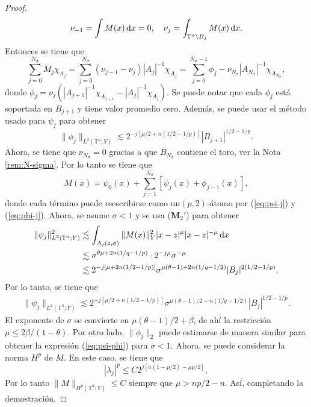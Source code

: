 \begin{proof}
	\begin{equation*}
		\nu_{-1} = \int M(x)\mathop{}\!\mathrm{d} x = 0, \quad \nu_j = \int_{\mathbb{T}^n\setminus B_j} M(x)\mathop{}\!\mathrm{d} x.
	\end{equation*}
	Entonces se tiene que
	\begin{equation*}
		\sum_{j=0}^{N_\sigma}M_j \chi_{A_j} =\sum_{j=0}^{N_\sigma}(\nu_{j-1}-\nu_j)|A_j|^{-1}\chi_{A_j} = \sum_{j=0}^{N_\sigma-1}\phi_j - \nu_{N_\sigma}|A_{N_\sigma}|^{-1}\chi_{A_{N_\sigma}},
	\end{equation*}
	donde $\phi_j=\nu_j\left( |A_{j+1}|^{-1}\chi_{A_{j+1}} - |A_{j}|^{-1}\chi_{A_{j}}  \right)$. Se puede notar que cada $\phi_j$ está soportada en $B_{j+1}$ y tiene valor promedio cero. Además, se puede usar el método usado para $\psi_j$ para obtener
	\begin{equation}
		\|\phi_j\|_{L^2(\mathbb{T}^n;Y)} \lesssim 2^{-j[\mu/2 + n(1/2-1/p)]} |B_{j+1}|^{1/2-1/p}.
		\label{eq:phi-j}
	\end{equation}
	Ahora, se tiene que $\nu_{N_\sigma}=0$ gracias a que $B_{N_\sigma}$ contiene el toro, ver la Nota \ref{rem:N-sigma}. Por lo tanto se tiene que 
	\begin{equation}
		M(x)= \psi_0(x)+ \sum_{j=1}^{N_\sigma} \left[\psi_j(x) + \phi_{j-1}(x) \right],
		\label{eq:psi-phi}
	\end{equation}
	donde cada término puede reescribirse como un$(p,2)$-átomo por (\ref{eq:psi-j}) y (\ref{eq:phi-j}). Ahora, se asume $\sigma<1$ y se usa ($\mathbf{M}_2'$) para obtener
	\begin{align*}
		\|\psi_j\|_{L^2(\mathbb{T}^n;Y)}^2  &\lesssim \int_{A_j(z,\sigma)}\|M(x)\|_Y^2|x-z|^{\mu} |x-z|^{-\mu} \mathop{}\!\mathrm{d} x
		\\
		 & \lesssim \sigma^{\theta\mu+2n(1/q-1/p)}\cdot2^{-j\mu} \sigma^{-\mu}
		\\
		 &\lesssim 2^{-j[\mu + 2n(1/2-1/p)]} \sigma^{\mu(\theta-1) + 2n(1/q-1/2)} |B_j|^{2(1/2-1/p)}.
	\end{align*}
	Por lo tanto, se tiene que 
	\begin{align*}
		\|\psi_j\|_{L^2(\mathbb{T}^n;Y)}  \lesssim 2^{-j[\mu/2 + n(1/2-1/p)]} \sigma^{\mu(\theta-1)/2+n(1/q-1/2)} |B_j|^{1/2-1/p}.
	\end{align*}
	El exponente de $\sigma$ se convierte en $\mu(\theta-1)/2 + \beta$, de ahí la restricción $\mu \leq 2\beta/(1-\theta)$. Por otro lado, $\|\phi_j\|_2$ puede estimarse de manera similar para obtener la expresión (\ref{eq:psi-phi}) para $\sigma<1$. Ahora, se puede considerar la norma $H^p$ de $M$. En este caso, se tiene que
	\begin{equation*}
		|\lambda_j|^p \leq C 2^{j[ n(1-p/2) -\mu p/2 ]},
	\end{equation*}
	Por lo tanto $\|M\|_{H^p(\mathbb{T}^n;Y)} \leq C$ siempre que $\mu > np/2 -n$. Así, completando la demostración.
\end{proof}
